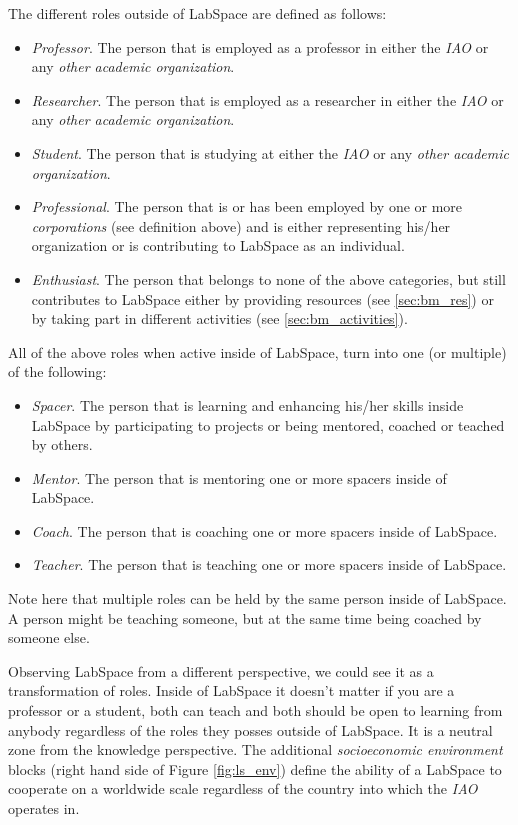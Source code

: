 \documentclass[a4paper, 11pt]{article}
\begin{document}
The different roles outside of LabSpace are defined as follows:

\begin{itemize}[noitemsep]
    \item \textit{Professor}. The person that is employed as a professor in either the \textit{IAO} or any \textit{other academic organization}.
    \item \textit{Researcher}. The person that is employed as a researcher in either the \textit{IAO} or any \textit{other academic organization}.
    \item \textit{Student}. The person that is studying at either the \textit{IAO} or any \textit{other academic organization}.
    \item \textit{Professional}. The person that is or has been employed by one or more \textit{corporations} (see definition above) and is either representing his/her organization or is contributing to LabSpace as an individual.
    \item \textit{Enthusiast}. The person that belongs to none of the above categories, but still contributes to LabSpace either by providing resources (see \ref{sec:bm_res}) or by taking part in different activities  (see \ref{sec:bm_activities}).
\end{itemize}

All of the above roles when active inside of LabSpace, turn into one (or multiple) of the following:

\begin{itemize}[noitemsep]
    \item \textit{Spacer}. The person that is learning and enhancing his/her skills inside LabSpace by participating to projects or being mentored, coached or teached by others.
    \item \textit{Mentor}. The person that is mentoring one or more spacers inside of LabSpace.
    \item \textit{Coach}. The person that is coaching one or more spacers inside of LabSpace.
    \item \textit{Teacher}. The person that is teaching one or more spacers inside of LabSpace.
\end{itemize}

Note here that multiple roles can be held by the same person inside of LabSpace. A person might be teaching someone, but at the same time being coached by someone else.

Observing LabSpace from a different perspective, we could see it as a transformation of roles. Inside of LabSpace it doesn't matter if you are a professor or a student, both can teach and both should be open to learning from anybody regardless of the roles they posses outside of LabSpace. It is a neutral zone from the knowledge perspective. The additional \textit{socioeconomic environment} blocks (right hand side of Figure \ref{fig:ls_env}) define the ability of a LabSpace to cooperate on a worldwide scale regardless of the country into which the \textit{IAO} operates in.
\end{document}
